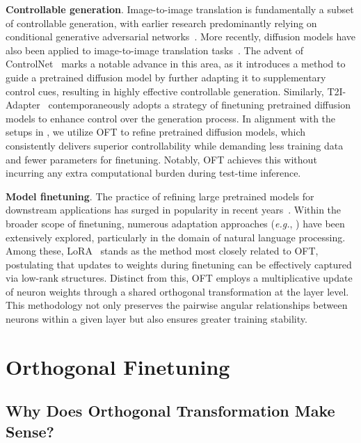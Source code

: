 \textbf{Controllable generation}. Image-to-image translation is fundamentally a subset of controllable generation, with earlier research predominantly relying on conditional generative adversarial networks~\cite{isola2017image,zhu2017toward,wang2018high,park2019semantic,choi2018stargan}. More recently, diffusion models have also been applied to image-to-image translation tasks~\cite{saharia2022palette,voynov2022sketch,wang2022pretraining}. The advent of ControlNet~\cite{zhang2023adding} marks a notable advance in this area, as it introduces a method to guide a pretrained diffusion model by further adapting it to supplementary control cues, resulting in highly effective controllable generation. Similarly, T2I-Adapter~\cite{mou2023t2i} contemporaneously adopts a strategy of finetuning pretrained diffusion models to enhance control over the generation process. In alignment with the setups in \cite{zhang2023adding,mou2023t2i}, we utilize OFT to refine pretrained diffusion models, which consistently delivers superior controllability while demanding less training data and fewer parameters for finetuning. Notably, OFT achieves this without incurring any extra computational burden during test-time inference.

\textbf{Model finetuning}. The practice of refining large pretrained models for downstream applications has surged in popularity in recent years~\cite{devlin2018bert,brown2020language,he2022masked}. Within the broader scope of finetuning, numerous adaptation approaches (\emph{e.g.}, \cite{hulora2022,houlsby2019parameter,pfeiffer2020adapterfusion}) have been extensively explored, particularly in the domain of natural language processing. Among these, LoRA~\cite{hulora2022} stands as the method most closely related to OFT, postulating that updates to weights during finetuning can be effectively captured via low-rank structures. Distinct from this, OFT employs a multiplicative update of neuron weights through a shared orthogonal transformation at the layer level. This methodology not only preserves the pairwise angular relationships between neurons within a given layer but also ensures greater training stability.

\section{Orthogonal Finetuning}

\subsection{Why Does Orthogonal Transformation Make Sense?}

